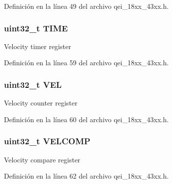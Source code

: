 Definición en la línea 49 del archivo qei\+\_\+18xx\+\_\+43xx.\+h.

\subsubsection[{\texorpdfstring{T\+I\+ME}{TIME}}]{ uint32\+\_\+t T\+I\+ME}\hypertarget{struct_l_p_c___q_e_i___t_a45972042b8ed968faf953014e85c8765}{}\label{struct_l_p_c___q_e_i___t_a45972042b8ed968faf953014e85c8765}
Velocity timer register 

Definición en la línea 59 del archivo qei\+\_\+18xx\+\_\+43xx.\+h.

\subsubsection[{\texorpdfstring{V\+EL}{VEL}}]{ uint32\+\_\+t V\+EL}\hypertarget{struct_l_p_c___q_e_i___t_afaffde0c517350e082048e0d43ebb845}{}\label{struct_l_p_c___q_e_i___t_afaffde0c517350e082048e0d43ebb845}
Velocity counter register 

Definición en la línea 60 del archivo qei\+\_\+18xx\+\_\+43xx.\+h.

\subsubsection[{\texorpdfstring{V\+E\+L\+C\+O\+MP}{VELCOMP}}]{ uint32\+\_\+t V\+E\+L\+C\+O\+MP}\hypertarget{struct_l_p_c___q_e_i___t_a3b8a3061fc289eae7164720f46967be2}{}\label{struct_l_p_c___q_e_i___t_a3b8a3061fc289eae7164720f46967be2}
Velocity compare register 

Definición en la línea 62 del archivo qei\+\_\+18xx\+\_\+43xx.\+h.

